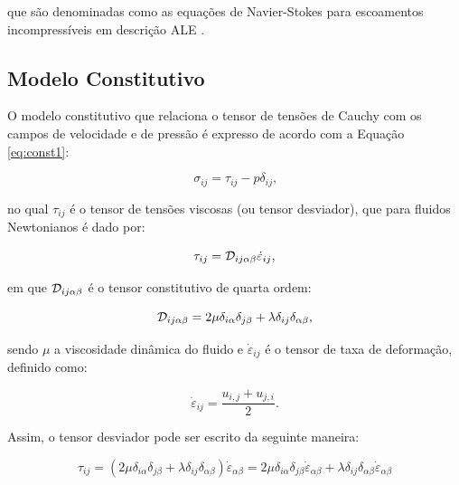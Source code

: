 \noindent que são denominadas como as equações de Navier-Stokes para escoamentos incompressíveis em descrição ALE \cite{bazilevs2013computational}.

\subsection{Modelo Constitutivo} \label{MC}

O modelo constitutivo que relaciona o tensor de tensões de Cauchy com os campos de velocidade e de pressão é expresso de acordo com a Equação \ref{eq:const1}:

\begin{equation}
    \sigma_{ij}=\tau_{ij}-p\delta_{ij}\text{,}\label{eq:const1}
\end{equation}

\noindent no qual $\tau_{ij}$ é o tensor de tensões viscosas (ou tensor desviador), que para fluidos Newtonianos é dado por:

\begin{equation}
    \tau_{ij}=\mathcal{D}_{ij\alpha\beta}\dot{\varepsilon}_{ij}\text{,}
\end{equation}

\noindent em que $\mathcal{D}_{ij\alpha\beta}$ é o tensor constitutivo de quarta ordem:

\begin{equation}
    \mathcal{D}_{ij\alpha\beta}=2\mu\delta_{i\alpha}\delta_{j\beta}+\lambda\delta_{ij}\delta_{\alpha\beta}\text{,}
\end{equation}

\noindent sendo $\mu$ a viscosidade dinâmica do fluido e $\dot{\varepsilon}_{ij}$ é o tensor de taxa de deformação, definido como:

\begin{equation}
    \dot{\varepsilon}_{ij}=\frac{u_{i,j}+u_{j,i}}{2}\text{.}\label{eq:deftax1}
\end{equation}

Assim, o tensor desviador pode ser escrito da seguinte maneira:

\[\tau_{ij}=(2\mu\delta_{i\alpha}\delta_{j\beta}+\lambda\delta_{ij}\delta_{\alpha\beta})\dot{\varepsilon}_{\alpha\beta}=2\mu\delta_{i\alpha}\delta_{j\beta}\dot{\varepsilon}_{\alpha\beta}+\lambda\delta_{ij}\delta_{\alpha\beta}\dot{\varepsilon}_{\alpha\beta}\]

